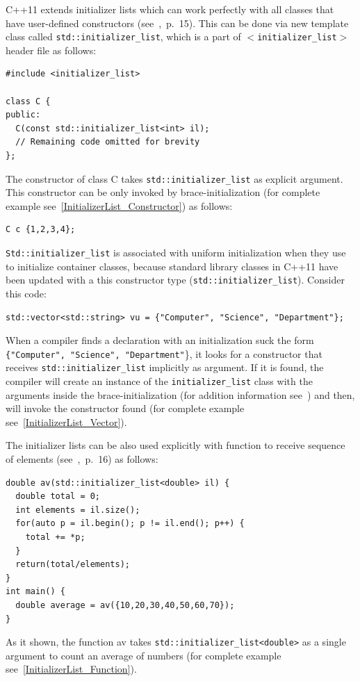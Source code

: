 \documentclass[11pt]{report}
\begin{document}
C++11 extends initializer lists which can work perfectly with all classes that have user-defined constructors (see~\cite{Reddy:2011:API},~p.~15). This can be done via new template class called \texttt{std::initializer\_list}, which is a part of \texttt{$<$initializer\_list$>$} header file as follows:
\begin{lstlisting} 
#include <initializer_list>

class C {
public:
  C(const std::initializer_list<int> il);
  // Remaining code omitted for brevity
};
\end{lstlisting}
The constructor of class C takes \texttt{std::initializer\_list} as explicit argument. This constructor can be only invoked by brace-initialization (for complete example see~\ref{InitializerList_Constructor}) as follows: 
\begin{lstlisting}
C c {1,2,3,4};
\end{lstlisting}
\texttt{Std::initializer\_list} is associated with uniform initialization when they use to initialize container classes, because standard library classes in C++11 have been updated with a this constructor type (\texttt{std::initializer\_list}). Consider this code:
\begin{lstlisting}
std::vector<std::string> vu = {"Computer", "Science", "Department"};
\end{lstlisting}
When a compiler finds a declaration with an initialization suck the form \linebreak\texttt{\{"Computer", "Science", "Department"}\}, it looks for a constructor that receives \texttt{std::initializer\_list} implicitly as argument. If it is found, the compiler will create an instance of the \texttt{initializer\_list} class with the arguments inside the brace-initialization (for addition information see~\cite{Stroustrup:2012:Cpp11}) and then, will invoke the constructor found (for complete example see~\ref{InitializerList_Vector}). 

The initializer lists can be also used explicitly with function to receive sequence of elements (see~\cite{Reddy:2011:API},~p.~16) as follows:
\begin{lstlisting}
double av(std::initializer_list<double> il) {
  double total = 0;
  int elements = il.size();
  for(auto p = il.begin(); p != il.end(); p++) {
    total += *p;
  }
  return(total/elements);
}
int main() {
  double average = av({10,20,30,40,50,60,70});
}
\end{lstlisting}
As it shown, the function av takes \texttt{std::initializer\_list<double>} as a single argument to count an average of numbers (for complete example see~\ref{InitializerList_Function}).
\end{document}
